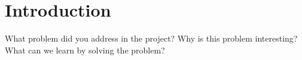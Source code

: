 \section{Introduction}
\label{sec:introduction}

What problem did you address in the project? Why is this problem interesting? What can we learn by solving the problem?